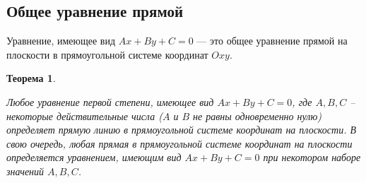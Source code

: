 \documentclass[a4paper,12pt,oneside]{extbook}
\newcommand{\newpar}{$ $\par\nobreak\ignorespaces}
\theoremstyle{numbered}
\theoremstyle{unnumbered}
\theoremstyle{named}
\newtheorem{theorem}{Теорема}[section]
\theoremstyle{unnumbered}
\theoremstyle{named}
\theoremstyle{named}
\theoremstyle{named}
\begin{document}
\subsection{Общее уравнение прямой}

Уравнение, имеющее вид \(Ax + By + C = 0\) — это общее уравнение прямой на плоскости в прямоугольной системе координат \(Oxy\).

\begin{theorem}
    \newpar
    Любое уравнение первой степени, имеющее вид \(Ax + By + C = 0\), где \(A, B, C\) – некоторые действительные числа (\(A\) и \(B\) не равны одновременно нулю) определяет прямую линию в прямоугольной системе координат на плоскости.
    В свою очередь, любая прямая в прямоугольной системе координат на плоскости определяется уравнением, имеющим вид \(Ax + By + C = 0\) при некотором наборе значений \(A, B, C\).
\end{theorem}
\end{document}
